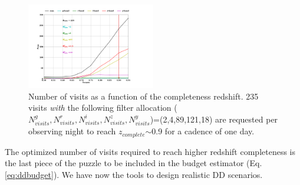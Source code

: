 \documentclass[skiphelvet,twocolumn]{aastex63}
\newcommand{\snrb}{\mbox{$SNR^b$}}
\newcommand{\sne}{{SNe~Ia}}
\newcommand{\zcomp}{\mbox{$z_{complete}$}}
\newcommand{\seq}{$\sim$}
\newcommand{\nvisitsall}{$N_{visits}^g,N_{visits}^r,N_{visits}^i,N_{visits}^z,N_{visits}^y$}
\begin{document}
\begin{figure}[htbp]
  \includegraphics[width=0.5\textwidth,left]{nvisits_zlim.png}
 \caption{Number of visits as a function of the completeness redshift. 235 visits {\it with} the following filter allocation (\nvisitsall)=(2,4,89,121,18) are requested per observing night to reach \zcomp\seq 0.9 for a cadence of one day.}\label{fig:nvisits_zlim}
\end{figure}
\par
The optimized number of visits required to reach higher redshift completeness is the last piece of the puzzle to be included in the budget estimator (Eq. \ref{eq:ddbudget}). We have now the tools to design realistic DD scenarios.

\end{document}
